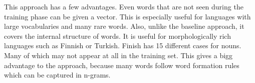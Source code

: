 This approach has a few advantages.
Even words that are not seen during the training phase can be given a vector.
This is especially useful for languages with large vocabularies and many rare words.
Also, unlike the baseline approach, it covers the internal structure of words.
It is useful for morphologically rich languages such as Finnish or Turkish.
Finish has 15 different cases for nouns.
Many of which may not appear at all in the training set.
This gives a bigg advantage to the approach, because many words follow word formation rules which can be captured in n-grams.



\subsubsection{}

\subsection{}

\subsection{}


\section{}
